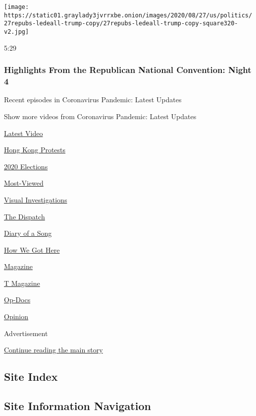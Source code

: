 \begin{itemize}
  \texttt{[image: https://static01.graylady3jvrrxbe.onion/images/2020/08/27/us/politics/27repubs-ledeall-trump-copy/27repubs-ledeall-trump-copy-square320-v2.jpg]}

  5:29

  \hypertarget{highlights-from-the-republican-national-convention-night-4}{%
  \subsubsection{Highlights From the Republican National Convention:
  Night
  4}\label{highlights-from-the-republican-national-convention-night-4}}
\end{itemize}

Recent episodes in Coronavirus Pandemic: Latest Updates

Show more videos from Coronavirus Pandemic: Latest Updates

\href{/video}{}

\href{/video/latest-video}{Latest Video}

\href{/video/hk-protest}{Hong Kong Protests}

\href{/video/2020-Elections}{2020 Elections}

\href{/video/Most-Viewed}{Most-Viewed}

\href{/video/investigations}{Visual Investigations}

\href{/video/on-the-ground}{The Dispatch}

\href{/video/diaryofasong}{Diary of a Song}

\href{/video/how-we-got-here}{How We Got Here}

\href{/video/magazine}{Magazine}

\href{/video/t-magazine}{T Magazine}

\href{/video/op-docs}{Op-Docs}

\href{/video/opinion}{Opinion}

Advertisement

\protect\hyperlink{after-bottom}{Continue reading the main story}

\hypertarget{site-index}{%
\subsection{Site Index}\label{site-index}}

\hypertarget{site-information-navigation}{%
\subsection{Site Information
Navigation}\label{site-information-navigation}}

